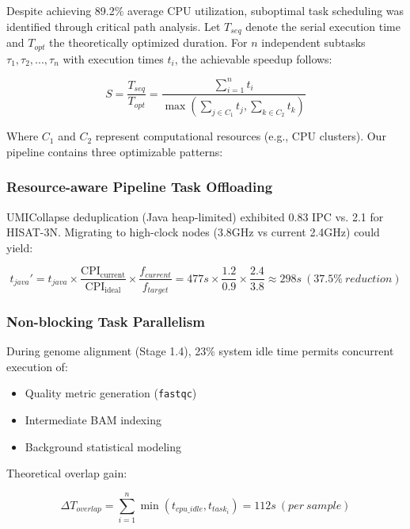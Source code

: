 \documentclass[a4paper,12pt]{article}
\begin{document}
Despite achieving 89.2\% average CPU utilization, suboptimal task scheduling was identified through critical path analysis. Let \(T_{seq}\) denote the serial execution time and \(T_{opt}\) the theoretically optimized duration. For \(n\) independent subtasks \(\tau_1,\tau_2,...,\tau_n\) with execution times \(t_i\), the achievable speedup follows:

\begin{equation}
S = \frac{T_{seq}}{T_{opt}} = \frac{\sum_{i=1}^n t_i}{\max\left(\sum_{j\in C_1} t_j, \sum_{k\in C_2} t_k\right)}
\end{equation}

Where \(C_1\) and \(C_2\) represent computational resources (e.g., CPU clusters). Our pipeline contains three optimizable patterns:

\subsubsection{Resource-aware Pipeline Task Offloading}
UMICollapse deduplication (Java heap-limited) exhibited 0.83 IPC vs. 2.1 for HISAT-3N. Migrating to high-clock nodes (3.8GHz vs current 2.4GHz) could yield:

\begin{equation}
t_{java}' = t_{java} \times \frac{\mathrm{CPI_{current}}}{\mathrm{CPI_{ideal}}} \times \frac{f_{current}}{f_{target}} = 477s \times \frac{1.2}{0.9} \times \frac{2.4}{3.8} \approx 298s\ (37.5\%\ reduction)
\end{equation}

\subsubsection{Non-blocking Task Parallelism}
During genome alignment (Stage 1.4), 23\% system idle time permits concurrent execution of:
\begin{itemize}
    \item Quality metric generation (\texttt{fastqc})
    \item Intermediate BAM indexing
    \item Background statistical modeling
\end{itemize}

Theoretical overlap gain:

\begin{equation}
\Delta T_{overlap} = \sum_{i=1}^n \min(t_{cpu\_idle}, t_{task_i}) = 112s\ (per\ sample)
\end{equation}
\end{document}
